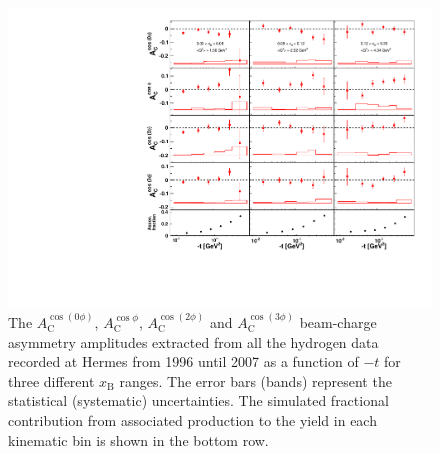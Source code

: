 \begin{figure}
  \begin{center}
    \includegraphics[width=15cm]{bca_2D}
    \caption{The $A_{\textrm{C}}^{\cos(0\phi)}$, $A_{\textrm{C}}^{\cos\phi}$, $A_{\textrm{C}}^{\cos(2\phi)}$ and $A_{\textrm{C}}^{\cos(3\phi)}$ beam-charge asymmetry amplitudes extracted from all the hydrogen data recorded at H{\sc ermes} from 1996 until 2007 as a function of $-t$ for three different $x_{\textrm{B}}$ ranges. The error bars (bands) represent the statistical (systematic) uncertainties. The simulated fractional contribution from associated production to the yield in each kinematic bin is shown in the bottom row.}
  \label{bca_xbjrange2}
 \end{center}
\end{figure}

